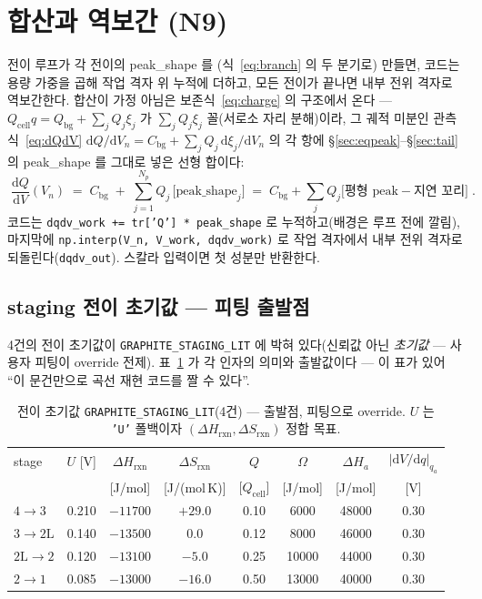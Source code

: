 \documentclass[11pt,a4paper]{article}
\newcommand{\dd}{\mathrm{d}}
\newcommand{\cell}{\mathrm{cell}}
\newcommand{\bg}{\mathrm{bg}}
\newcommand{\rxn}{\mathrm{rxn}}
\newcommand{\code}[1]{\texttt{#1}}
\begin{document}
\section{합산과 역보간 (N9)}\label{sec:sum}
전이 루프가 각 전이의 peak\_shape 를 (식~\eqref{eq:branch} 의 두 분기로) 만들면, 코드는 용량 가중을 곱해 작업 격자 위
누적에 더하고, 모든 전이가 끝나면 내부 전위 격자로 역보간한다. 합산이 가정 아님은 보존식~\eqref{eq:charge} 의 구조에서
온다 — $Q_\cell q=Q_\bg+\sum_jQ_j\xi_j$ 가 $\sum_jQ_j\xi_j$ 꼴(서로소 자리 분해)이라, 그 궤적 미분인 관측식~\eqref{eq:dQdV}
$\dd Q/\dd V_n=C_\bg+\sum_jQ_j\,\dd\xi_j/\dd V_n$ 의 각 항에 \S\ref{sec:eqpeak}--\S\ref{sec:tail} 의 peak\_shape 를
그대로 넣은 선형 합이다:
\begin{equation}
\boxed{\;\frac{\dd Q}{\dd V}(V_n)\;=\;C_\bg\;+\;\sum_{j=1}^{N_p}Q_j\,
\big[\text{peak\_shape}_j\big]
\;=\;C_\bg+\sum_jQ_j\big[\text{평형 peak}-\text{지연 꼬리}\big]\;.}
\label{eq:sum}
\end{equation}
코드는 \code{dqdv\_work += tr['Q'] * peak\_shape} 로 누적하고(배경은 루프 전에 깔림), 마지막에
\code{np.interp(V\_n, V\_work, dqdv\_work)} 로 작업 격자에서 내부 전위 격자로 되돌린다(\code{dqdv\_out}).
스칼라 입력이면 첫 성분만 반환한다.

\subsection{staging 전이 초기값 — 피팅 출발점}
4건의 전이 초기값이 \code{GRAPHITE\_STAGING\_LIT} 에 박혀 있다(신뢰값 아닌 \emph{초기값} — 사용자 피팅이 override
전제). 표~\ref{tab:staging} 가 각 인자의 의미와 출발값이다 — 이 표가 있어 ``이 문건만으로 곡선 재현 코드를 짤 수 있다''.

\begin{table}[t]
\centering
\renewcommand{\arraystretch}{1.25}
\caption{전이 초기값 \code{GRAPHITE\_STAGING\_LIT}(4건) — 출발점, 피팅으로 override. $U$ 는 \code{'U'}
폴백이자 $(\Delta H_\rxn,\Delta S_\rxn)$ 정합 목표.}
\label{tab:staging}
\begin{tabular}{l c c c c c c c}
\toprule
stage & $U$ [V] & $\Delta H_\rxn$ & $\Delta S_\rxn$ & $Q$ & $\Omega$ & $\Delta H_a$ & $|\dd V/\dd q|_{q_a}$ \\
 &  & [J/mol] & [J/(mol\,K)] & [$Q_\cell$] & [J/mol] & [J/mol] & [V] \\
\midrule
$4\!\to\!3$   & 0.210 & $-11700$ & $+29.0$ & 0.10 & 6000  & 48000 & 0.30 \\
$3\!\to\!2\mathrm L$ & 0.140 & $-13500$ & $0.0$   & 0.12 & 8000  & 46000 & 0.30 \\
$2\mathrm L\!\to\!2$ & 0.120 & $-13100$ & $-5.0$  & 0.25 & 10000 & 44000 & 0.30 \\
$2\!\to\!1$   & 0.085 & $-13000$ & $-16.0$ & 0.50 & 13000 & 40000 & 0.30 \\
\bottomrule
\end{tabular}
\end{table}
\end{document}
